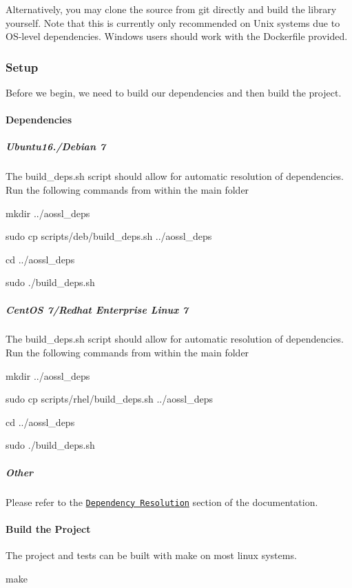 Alternatively, you may clone the source from git directly and build the library yourself. Note that this is currently only recommended on Unix systems due to O\+S-\/level dependencies. Windows users should work with the Dockerfile provided.

\subsubsection*{Setup}

Before we begin, we need to build our dependencies and then build the project.

\paragraph*{Dependencies}

\subparagraph*{Ubuntu16./\+Debian 7}

The build\+\_\+deps.\+sh script should allow for automatic resolution of dependencies. Run the following commands from within the main folder \begin{DoxyVerb}mkdir ../aossl_deps

sudo cp scripts/deb/build_deps.sh ../aossl_deps

cd ../aossl_deps

sudo ./build_deps.sh
\end{DoxyVerb}


\subparagraph*{Cent\+OS 7/\+Redhat Enterprise Linux 7}

The build\+\_\+deps.\+sh script should allow for automatic resolution of dependencies. Run the following commands from within the main folder \begin{DoxyVerb}mkdir ../aossl_deps

sudo cp scripts/rhel/build_deps.sh ../aossl_deps

cd ../aossl_deps

sudo ./build_deps.sh
\end{DoxyVerb}


\subparagraph*{Other}

Please refer to the \href{https://github.com/AO-StreetArt/AOSharedServiceLibrary/tree/master/docs/deps}{\tt Dependency Resolution} section of the documentation.

\paragraph*{Build the Project}

The project and tests can be built with make on most linux systems. \begin{DoxyVerb}make
\end{DoxyVerb}


